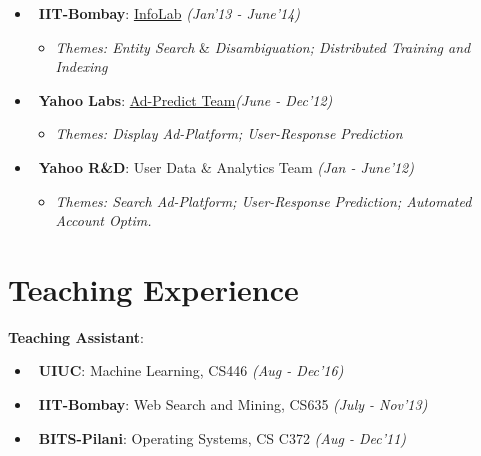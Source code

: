 \documentclass[margin,line]{templates/resume}
\newcommand{\compresslist}{%
\setlength{\itemsep}{3pt}%
\setlength{\parskip}{0pt}%
\setlength{\parsep}{0pt}%
}
\begin{document}
\begin{resume}
\begin{itemize}[leftmargin = 0.7cm]
\item~\textbf{IIT-Bombay}: \href{http://www.cse.iitb.ac.in/infolab}{InfoLab} \hfill{\small\textit{(Jan'13 - June'14)}}
\vspace{-1mm}
\begin{itemize}[leftmargin=*]\compresslist
        \item[]\small\textit{Themes: Entity Search} \&\textit{ Disambiguation; Distributed Training and Indexing}
    \end{itemize}
\item~\textbf{Yahoo Labs}: \href{https://research.yahoo.com/research-areas/advertising-science}{Ad-Predict Team}\hfill{\small\textit{(June - Dec'12)}}
\vspace{-1mm}
\begin{itemize}[leftmargin=*]\compresslist
        \item[]\small\textit{Themes: Display Ad-Platform; User-Response Prediction}
    \end{itemize}
\item~\textbf{Yahoo R\&D}: User Data \& Analytics Team \hfill{\small\textit{(Jan - June'12)}}
\vspace{-1mm}
\begin{itemize}[leftmargin=*]\compresslist
        \item[]\small\textit{Themes: Search Ad-Platform; User-Response Prediction; Automated Account Optim.}
    \end{itemize}
\end{itemize}

\vspace{-0.1cm}
\section{\mysidestyle Teaching Experience} 
\textsf{\textbf{Teaching Assistant}}:
\begin{itemize}[leftmargin = 0.7cm]\compresslist
\item~\textbf{UIUC}: Machine Learning, CS446 \hfill{\small\textit{(Aug - Dec'16)}}\vspace{-1mm}
\item~\textbf{IIT-Bombay}: Web Search and Mining, CS635 \hfill{\small\textit{(July - Nov'13)}}\vspace{-1mm}
\item~\textbf{BITS-Pilani}: Operating Systems, CS C372 \hfill{\small\textit{(Aug - Dec'11)}}
\end{itemize}

\vspace{-0.1cm}

\end{resume}
\end{document}
